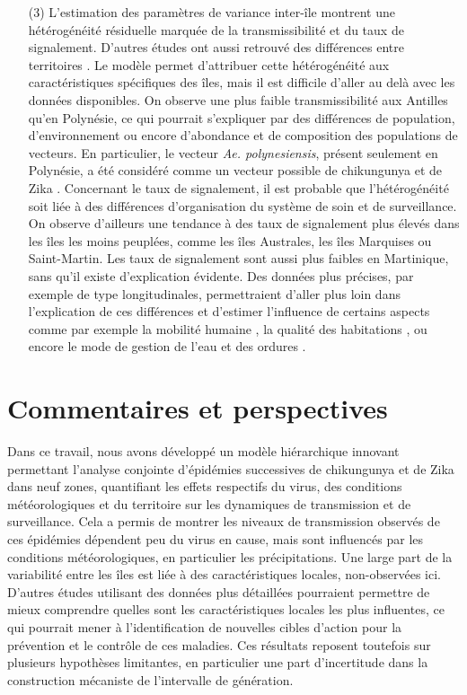 \begin{itemize}
\vspace{.3em}
\item[(3)] L'estimation des paramètres de variance inter-île montrent une hétérogénéité résiduelle marquée de la transmissibilité et du taux de signalement. 
D'autres études ont aussi retrouvé des différences entre territoires \cite{kucharski2016transmission,Champagne064949,cauchemez2014local,nishiura2016transmission,chowell_using_2016,funk2016comparative}. 
Le modèle permet d'attribuer cette hétérogénéité aux caractéristiques spécifiques des îles, mais il est difficile d'aller au delà avec les données disponibles.
On observe une plus faible transmissibilité aux Antilles qu'en Polynésie, ce qui pourrait s'expliquer par des différences de population, d'environnement ou encore d'abondance et de composition des populations de vecteurs.
En particulier, le vecteur {\em Ae. polynesiensis}, présent seulement en Polynésie, a été considéré comme un vecteur possible de chikungunya et de Zika \cite{richard2016vector}.
Concernant le taux de signalement, il est probable que l'hétérogénéité soit liée à des différences d'organisation du système de soin et de surveillance. 
On observe d'ailleurs une tendance à des taux de signalement plus élevés dans les îles les moins peuplées, comme les îles Australes, les îles Marquises ou Saint-Martin.
Les taux de signalement sont aussi plus faibles en Martinique, sans qu'il existe d'explication évidente.
Des données plus précises, par exemple de type longitudinales, permettraient d'aller plus loin dans l'explication de ces différences et d'estimer l'influence de certains aspects comme par exemple la mobilité humaine \cite{stoddard2013house}, la qualité des habitations \cite{reiter_texas_2003}, ou encore le mode de gestion de l'eau et des ordures \cite{monath1994dengue}.

\end{itemize}

\section{Commentaires et perspectives}

Dans ce travail, nous avons développé un modèle hiérarchique innovant permettant l'analyse conjointe d'épidémies successives de chikungunya et de Zika dans neuf zones, quantifiant les effets respectifs du virus, des conditions météorologiques et du territoire sur les dynamiques de transmission et de surveillance.
Cela a permis de montrer les niveaux de transmission observés de ces épidémies dépendent peu du virus en cause, mais sont influencés par les conditions météorologiques, en particulier les précipitations.
Une large part de la variabilité entre les îles est liée à des caractéristiques locales, non-observées ici.
D'autres études utilisant des données plus détaillées pourraient permettre de mieux comprendre quelles sont les caractéristiques locales les plus influentes, ce qui pourrait mener à l'identification de nouvelles cibles d'action pour la prévention et le contrôle de ces maladies.
Ces résultats reposent toutefois sur plusieurs hypothèses limitantes, en particulier une part d'incertitude dans la construction mécaniste de l'intervalle de génération.

